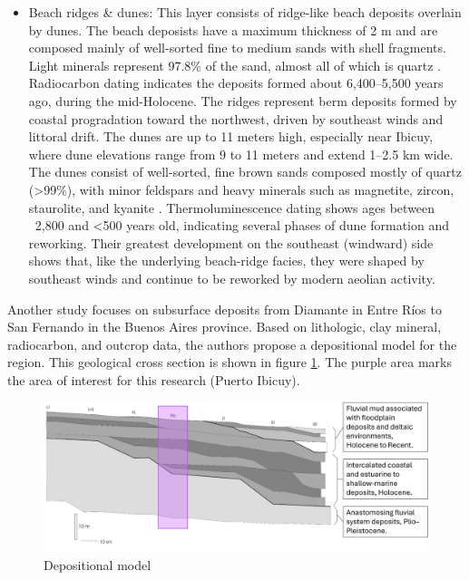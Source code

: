 \begin{itemize}
    \item Beach ridges & dunes: This layer consists of ridge-like beach deposits overlain by dunes. The beach deposists have a maximum thickness of 2 m and are composed mainly of well-sorted fine to medium sands with shell fragments. Light minerals represent 97.8\% of the sand, almost all of which is quartz \autocite{rafaelcordiniContribucionConocimientoGeologia1949}. Radiocarbon dating indicates the deposits formed about 6,400–5,500 years ago, during the mid-Holocene. The ridges represent berm deposits formed by coastal progradation toward the northwest, driven by southeast winds and littoral drift.
    The dunes are up to 11 meters high, especially near Ibicuy, where dune elevations range from 9 to 11 meters and extend 1–2.5 km wide. The dunes consist of well-sorted, fine brown sands composed mostly of quartz (>99\%), with minor feldspars and heavy minerals such as magnetite, zircon, staurolite, and kyanite \autocite{rafaelcordiniContribucionConocimientoGeologia1949}. Thermoluminescence dating shows ages between ~2,800 and <500 years old, indicating several phases of dune formation and reworking. Their greatest development on the southeast (windward) side shows that, like the underlying beach-ridge facies, they were shaped by southeast winds and continue to be reworked by modern aeolian activity.
\end{itemize}

Another study focuses on subsurface deposits from Diamante in Entre Ríos to San Fernando in the Buenos Aires province. Based on lithologic, clay mineral, radiocarbon, and outcrop data, the authors propose a depositional model for the region. This geological cross section is shown in figure \ref{fig:depmodel}. The purple area marks the area of interest for this research (Puerto Ibicuy).

\begin{figure}[H]
    \centering
    \includegraphics[width=1\linewidth]{figures/ch9/Crosssection2.png}
    \caption{Depositional model \autocite{amatoESTRATIGRAFIACUATERNARIASUBSUELO2009}}
    \label{fig:depmodel}
\end{figure}

